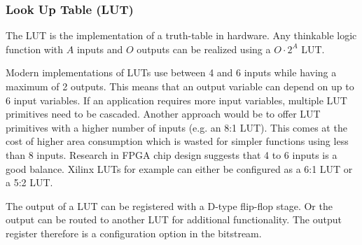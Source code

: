 \subsubsection{Look Up Table (LUT)}

The LUT is the implementation of a truth-table in hardware.
Any thinkable logic function with $A$ inputs and $O$ outputs can be realized using a $O\cdot 2^A$ LUT.

Modern implementations of LUTs use between 4 and 6 inputs while having a maximum of 2 outputs. 
This means that an output variable can depend on up to 6 input variables.
If an application requires more input variables, multiple LUT primitives need to be cascaded. 
Another approach would be to offer LUT primitives with a higher number of inputs (e.g. an 8:1 LUT). This comes at the cost of higher area consumption which is wasted for simpler functions using less than 8 inputs.
Research in FPGA chip design suggests that 4 to 6 inputs is a good balance.
Xilinx LUTs for example can either be configured as a 6:1 LUT or a 5:2 LUT.

The output of a LUT can be registered with a D-type flip-flop stage.
Or the output can be routed to another LUT for additional functionality.
The output register therefore is a configuration option in the bitstream.


